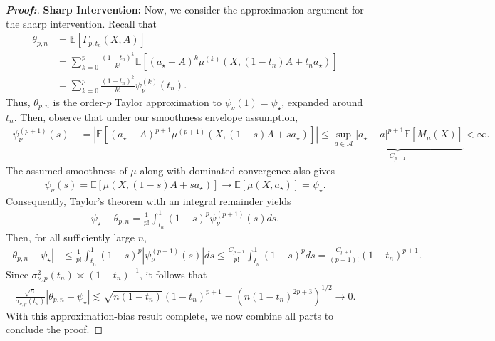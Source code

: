 \documentclass[10pt,a4paper]{amsart}
\begin{document}
\begin{proof}[\textbf{Proof:}]
\textbf{Sharp Intervention:} Now, we consider the approximation argument for the sharp intervention. Recall that
\begin{align*}
    \theta_{p,n} &=\mathbb{E}\!\left[\Gamma_{p,t_n}(X,A)\right] \\
    &= \sum_{k=0}^{p} \frac{(1-t_n)^k}{k!} \mathbb{E}\!\left[ (a_\star-A)^k \mu^{(k)} \!\left(X,(1-t_n)A+t_na_\star\right) \right] \\
    &= \sum_{k=0}^{p} \frac{(1-t_n)^k}{k!} \psi_\nu^{(k)}(t_n).
\end{align*}
Thus, $\theta_{p,n}$ is the order-$p$ Taylor approximation to $\psi_\nu(1)=\psi_\star$, expanded around $t_n$. Then, observe that under our smoothness envelope assumption,
\begin{align*}
    \left|\psi_\nu^{(p+1)}(s)\right| &= \left| \mathbb{E}\!\left[ (a_\star-A)^{p+1} \mu^{(p+1)}\!\left(X,(1-s)A+sa_\star\right) \right] \right| \leq \underbrace{\sup_{a\in\mathcal A}|a_\star-a|^{p+1}\mathbb{E}[M_\mu(X)]}_{C_{p+1}} <\infty.
\end{align*}
The assumed smoothness of $\mu$ along with dominated convergence also gives
\begin{align*}
    \psi_\nu(s) = \mathbb{E}\!\left[\mu\!\left(X,(1-s)A+sa_\star\right) \right] \longrightarrow \mathbb{E}[\mu(X,a_\star)] = \psi_\star.
\end{align*}
Consequently, Taylor's theorem with an integral remainder yields
\begin{align*}
    \psi_\star-\theta_{p,n} = \frac{1}{p!}
    \int_{t_n}^{1} (1-s)^p\psi_\nu^{(p+1)}(s)ds.
\end{align*}
Then, for all sufficiently large $n$,
\begin{align*}
    |\theta_{p,n}-\psi_\star| &\leq \frac{1}{p!} \int_{t_n}^{1} (1-s)^p \left|\psi_\nu^{(p+1)}(s)\right|ds \leq \frac{C_{p+1}}{p!} \int_{t_n}^{1}(1-s)^p ds = \frac{C_{p+1}}{(p+1)!} (1-t_n)^{p+1}.
\end{align*}
Since $\sigma_{\nu,p}^2(t_n)\asymp(1-t_n)^{-1}$, it follows that
\begin{align*}
    \frac{\sqrt{n}}{\sigma_{\nu,p}(t_n)} |\theta_{p,n}-\psi_\star| \lesssim \sqrt{n(1-t_n)}(1-t_n)^{p+1} = \left( n(1-t_n)^{2p+3} \right)^{1/2} \longrightarrow 0.
\end{align*}
With this approximation-bias result complete, we now combine all parts to conclude the proof.


\end{proof}
\end{document}
